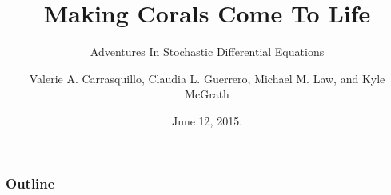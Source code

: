 \documentclass{beamer}
\begin{document}
\author{Valerie A. Carrasquillo, Claudia L. Guerrero, Michael M. Law, and Kyle McGrath}

\title{Making Corals Come To Life}
\subtitle{Adventures In Stochastic Differential Equations}
\date{June 12, 2015.}

\begin{frame}
  \titlepage
\end{frame}

\begin{frame}
  \frametitle{Outline}
  \tableofcontents
\end{frame}






\end{document}
